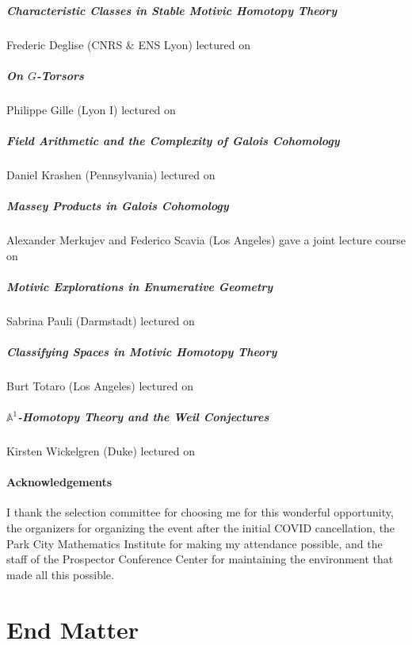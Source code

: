 \documentclass{amsart}
\theoremstyle{definition}
\numberwithin{equation}{section}
\begin{document}
\subsubsection*{Characteristic Classes in Stable Motivic Homotopy Theory} Frederic Deglise (CNRS \& ENS Lyon) lectured on 

\subsubsection*{On $G$-Torsors} Philippe Gille (Lyon I) lectured on 

\subsubsection*{Field Arithmetic and the Complexity of Galois Cohomology} Daniel Krashen (Pennsylvania) lectured on 

\subsubsection*{Massey Products in Galois Cohomology} Alexander Merkujev and Federico Scavia (Los Angeles) gave a joint lecture course on 

\subsubsection*{Motivic Explorations in Enumerative Geometry} Sabrina Pauli (Darmstadt) lectured on 

\subsubsection*{Classifying Spaces in Motivic Homotopy Theory} Burt Totaro (Los Angeles) lectured on

\subsubsection*{$\mathbb{A}^{1}$-Homotopy Theory and the Weil Conjectures} Kirsten Wickelgren (Duke) lectured on 

\subsection*{Acknowledgements} I thank the selection committee for choosing me for this wonderful opportunity, the organizers for organizing the event after the initial COVID cancellation, the Park City Mathematics Institute for making my attendance possible, and the staff of the Prospector Conference Center for maintaining the environment that made all this possible. 
\newpage
\tableofcontents










\newpage
\part*{End Matter}
\printbibliography
\end{document}
